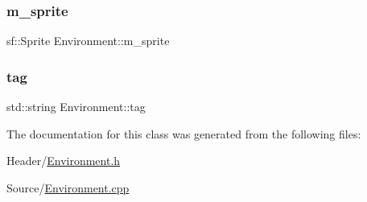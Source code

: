 \subsubsection{\texorpdfstring{m\_sprite}{m\_sprite}}
{\footnotesize\ttfamily sf\+::\+Sprite Environment\+::m\+\_\+sprite}

\mbox{\label{class_environment_a5858053529312140e8d7e8ab8b0f2dc0}} 
\subsubsection{\texorpdfstring{tag}{tag}}
{\footnotesize\ttfamily std\+::string Environment\+::tag}



The documentation for this class was generated from the following files\+:\begin{DoxyCompactItemize}
\item 
Header/\mbox{\hyperlink{_environment_8h}{Environment.\+h}}\item 
Source/\mbox{\hyperlink{_environment_8cpp}{Environment.\+cpp}}\end{DoxyCompactItemize}
